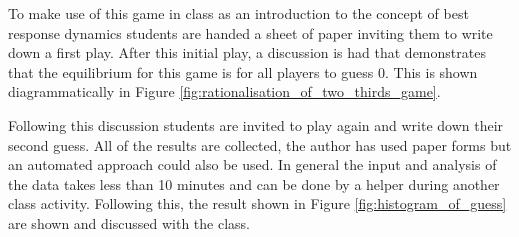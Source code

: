 \documentclass{article}
\begin{document}
To make use of this game in class as an introduction to the concept of best
response dynamics students are handed a sheet of paper inviting them to write
down a first play. After this initial play, a discussion is had that
demonstrates that the equilibrium for this game is for all players to guess 0.
This is shown diagrammatically in Figure
\ref{fig:rationalisation_of_two_thirds_game}.

Following this discussion students are invited to play again and write down
their second guess. All of the results are collected, the author has used paper
forms but an automated approach could also be used. In general the input and
analysis of the data takes less than 10 minutes and can be done by a helper
during another class activity.
Following this, the result shown in Figure \ref{fig:histogram_of_guess} are
shown and discussed with the class.
\end{document}
